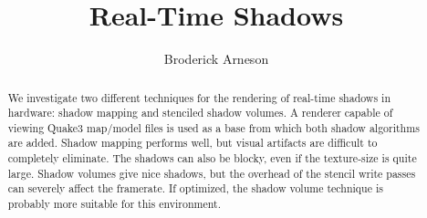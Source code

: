 \documentclass{llncs}
\begin{document}
\mainmatter 

\title{Real-Time Shadows}
\author{Broderick Arneson}
\maketitle
\begin{abstract}
We investigate two different techniques for the rendering of real-time shadows in
hardware: shadow mapping and stenciled shadow volumes.  
A renderer capable of viewing Quake3 map/model files is used as a base from which
both shadow algorithms are added.  Shadow mapping performs well, but visual artifacts
are difficult to completely eliminate.  The shadows can also be blocky, even if the
texture-size is quite large. Shadow volumes give nice shadows, but the overhead of
the stencil write passes can severely affect the framerate. If optimized,
the shadow volume technique is probably more suitable for this environment.
\end{abstract}
\end{document}
